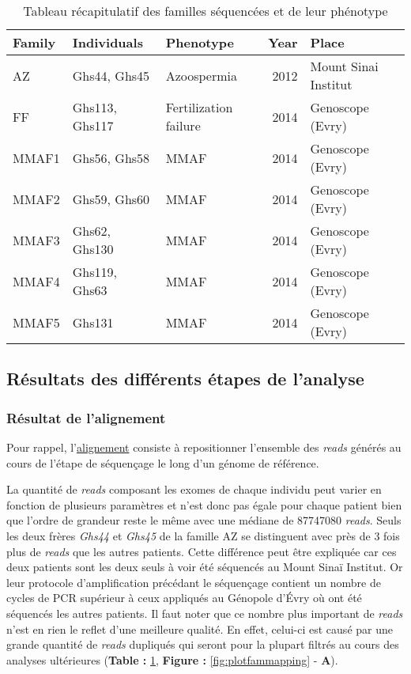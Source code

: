 \documentclass[12pt,twoside]{ugathesis}
\begin{document}
\begin{longtable}[t]{lllrl}
\caption{\label{tab:tabfam}Tableau récapitulatif des familles séquencées et de leur phénotype}\\
\toprule
Family & Individuals & Phenotype & Year & Place\\
\midrule
AZ & Ghs44, Ghs45 & Azoospermia & 2012 & Mount Sinai Institut\\
FF & Ghs113, Ghs117 & Fertilization failure & 2014 & Genoscope (Evry)\\
MMAF1 & Ghs56, Ghs58 & MMAF & 2014 & Genoscope (Evry)\\
MMAF2 & Ghs59, Ghs60 & MMAF & 2014 & Genoscope (Evry)\\
MMAF3 & Ghs62, Ghs130 & MMAF & 2014 & Genoscope (Evry)\\
\addlinespace
MMAF4 & Ghs119, Ghs63 & MMAF & 2014 & Genoscope (Evry)\\
MMAF5 & Ghs131 & MMAF & 2014 & Genoscope (Evry)\\
\bottomrule
\end{longtable}

\newpage 

\subsection{Résultats des différents étapes de
l'analyse}\label{resultats-des-differents-etapes-de-lanalyse}

\subsubsection{Résultat de l'alignement}\label{resultat-de-lalignement}

Pour rappel, l'\href{\%7B\#lalignement\%7D}{alignement} consiste à
repositionner l'ensemble des \emph{reads} générés au cours de l'étape de
séquençage le long d'un génome de référence.

La quantité de \emph{reads} composant les exomes de chaque individu peut
varier en fonction de plusieurs paramètres et n'est donc pas égale pour
chaque patient bien que l'ordre de grandeur reste le même avec une
médiane de 87747080 \emph{reads}. Seuls les deux frères \emph{Ghs44} et
\emph{Ghs45} de la famille AZ se distinguent avec près de 3 fois plus de
\emph{reads} que les autres patients. Cette différence peut être
expliquée car ces deux patients sont les deux seuls à voir été séquencés
au Mount Sinaï Institut. Or leur protocole d'amplification précédant le
séquençage contient un nombre de cycles de PCR supérieur à ceux
appliqués au Génopole d'Évry où ont été séquencés les autres patients.
Il faut noter que ce nombre plus important de \emph{reads} n'est en rien
le reflet d'une meilleure qualité. En effet, celui-ci est causé par une
grande quantité de \emph{reads} dupliqués qui seront pour la plupart
filtrés au cours des analyses ultérieures (\textbf{Table :}
\ref{tab:tabfam}, \textbf{Figure : }\ref{fig:plotfammapping} -
\textbf{A}).
\end{document}
